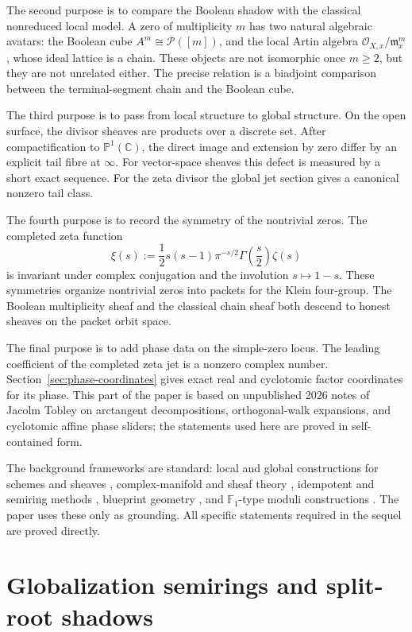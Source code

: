 \documentclass[11pt,a4paper]{article}
\theoremstyle{definition}
\theoremstyle{remark}
\newcommand{\CC}{\mathbb C}
\newcommand{\PP}{\mathbb P}
\newcommand{\cO}{\mathcal O}
\newcommand{\cP}{\mathcal P}
\begin{document}
The second purpose is to compare the Boolean shadow with the classical nonreduced local model. A zero of multiplicity $m$ has two natural algebraic avatars: the Boolean cube $A^m\cong\cP([m])$, and the local Artin algebra $\cO_{X,x}/\mathfrak m_x^m$, whose ideal lattice is a chain. These objects are not isomorphic once $m\geq 2$, but they are not unrelated either. The precise relation is a biadjoint comparison between the terminal-segment chain and the Boolean cube.

The third purpose is to pass from local structure to global structure. On the open surface, the divisor sheaves are products over a discrete set. After compactification to $\PP^1(\CC)$, the direct image and extension by zero differ by an explicit tail fibre at $\infty$. For vector-space sheaves this defect is measured by a short exact sequence. For the zeta divisor the global jet section gives a canonical nonzero tail class.

The fourth purpose is to record the symmetry of the nontrivial zeros. The completed zeta function
\[
\xi(s):=\frac12 s(s-1)\pi^{-s/2}\Gamma\!\left(\frac s2\right)\zeta(s)
\]
is invariant under complex conjugation and the involution $s\mapsto 1-s$. These symmetries organize nontrivial zeros into packets for the Klein four-group. The Boolean multiplicity sheaf and the classical chain sheaf both descend to honest sheaves on the packet orbit space.

The final purpose is to add phase data on the simple-zero locus. The leading coefficient of the completed zeta jet is a nonzero complex number. Section~\ref{sec:phase-coordinates} gives exact real and cyclotomic factor coordinates for its phase. This part of the paper is based on unpublished 2026 notes of Jacolm Tobley on arctangent decompositions, orthogonal-walk expansions, and cyclotomic affine phase sliders; the statements used here are proved in self-contained form.

The background frameworks are standard: local and global constructions for schemes and sheaves \cite{GrothendieckEGAII,Vakil,Hilgert}, complex-manifold and sheaf theory \cite{Lee}, idempotent and semiring methods \cite{GaubertKatz,Gunawardena,DrosteKuichVogler}, blueprint geometry \cite{Lorscheid}, and $\mathbb F_1$-type moduli constructions \cite{JarraLorscheidVital}. The paper uses these only as grounding. All specific statements required in the sequel are proved directly.

\section{Globalization semirings and split-root shadows}
\end{document}
